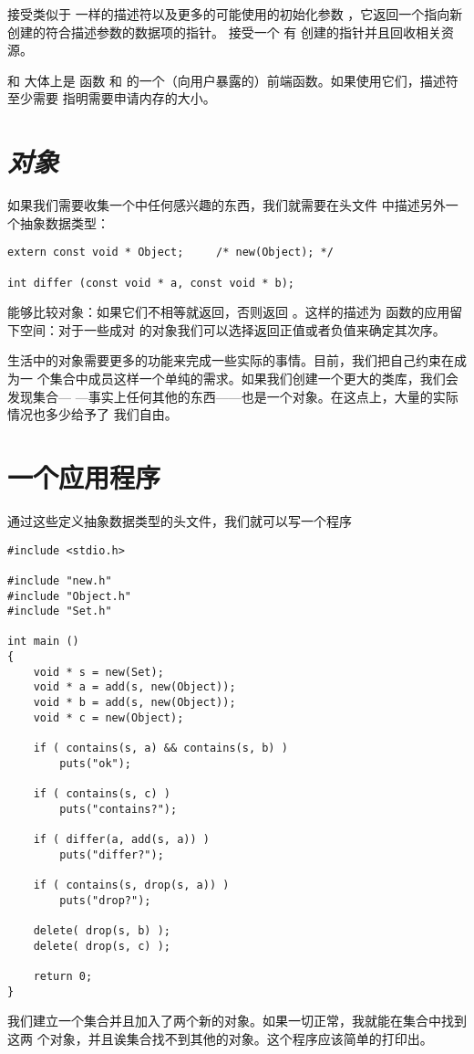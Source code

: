  接受类似于 一样的描述符以及更多的可能使用的初始化参数
，它返回一个指向新创建的符合描述参数的数据项的指针。 接受一个
有 创建的指针并且回收相关资源。

 和 大体上是 函数
和 的一个（向用户暴露的）前端函数。如果使用它们，描述符至少需要
指明需要申请内存的大小。

\section{\emph{对象}}
如果我们需要收集一个中任何感兴趣的东西，我们就需要在头文件
 中描述另外一个抽象数据类型：
\begin{lstlisting}
extern const void * Object;		/* new(Object); */

int differ (const void * a, const void * b);
\end{lstlisting}
 能够比较对象：如果它们不相等就返回，否则返回
。这样的描述为 函数的应用留下空间：对于一些成对
的对象我们可以选择返回正值或者负值来确定其次序。

生活中的对象需要更多的功能来完成一些实际的事情。目前，我们把自己约束在成为一
个集合中成员这样一个单纯的需求。如果我们创建一个更大的类库，我们会发现集合—
—事实上任何其他的东西——也是一个对象。在这点上，大量的实际情况也多少给予了
我们自由。

\section{一个应用程序}
通过这些定义抽象数据类型的头文件，我们就可以写一个程序
\begin{lstlisting}
#include <stdio.h>

#include "new.h"
#include "Object.h"
#include "Set.h"

int main ()
{
	void * s = new(Set);
	void * a = add(s, new(Object));
	void * b = add(s, new(Object));
	void * c = new(Object);

	if ( contains(s, a) && contains(s, b) )
		puts("ok");

	if ( contains(s, c) )
		puts("contains?");

	if ( differ(a, add(s, a)) )
		puts("differ?");

	if ( contains(s, drop(s, a)) )
		puts("drop?");

	delete( drop(s, b) );
	delete( drop(s, c) );

	return 0;
}
\end{lstlisting}
我们建立一个集合并且加入了两个新的对象。如果一切正常，我就能在集合中找到这两
个对象，并且诶集合找不到其他的对象。这个程序应该简单的打印出。

